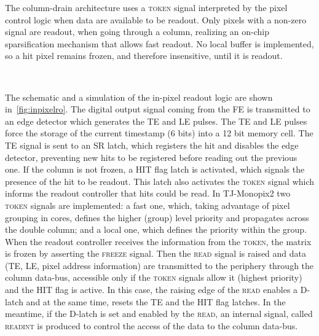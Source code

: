
The column-drain architecture uses a \textsc{token} signal interpreted by the pixel control logic when data are available to be readout. Only pixels with a non-zero signal are readout, when going through a column, realizing an on-chip sparsification mechanism that allows fast readout. No local buffer is implemented, so a hit pixel remains frozen, and therefore insensitive, until it is readout.

\begin{figure}[h!]
\centering
{}\\
\caption{}
\label{fig:inpixelro}
\end{figure}

\begin{comment}
\begin{figure}[h!]
\centering
\texttt{[image: inpixel\_ro]}
\caption{Schematic of TJ-Monopix2 in-pixel readout logic.}
\label{fig:inpixelro}
\end{figure}
\end{comment}



The schematic and a simulation of the in-pixel readout logic are shown in~\autoref{fig:inpixelro}.
The digital output signal coming from the FE is transmitted to an edge detector which generates the TE and LE pulses. The TE and LE pulses force the storage of the current timestamp (6 bits) into a 12 bit memory cell. The TE signal is sent to an SR latch, which registers the hit and disables the edge detector, preventing new hits to be registered before reading out the previous one. 
If the column is not frozen, a HIT flag latch is activated, which signals the presence of the hit to be readout. This latch also activates the \textsc{token} signal which informs the readout controller that hits could be read. In TJ-Monopix2 two \textsc{token} signals are implemented: a fast one, which, taking advantage of pixel grouping in  cores, defines the higher (group) level priority and propagates across the
double column; and a local one, which defines the priority within the group. When the readout controller receives the information from the \textsc{token}, the matrix is frozen by asserting the \textsc{freeze} signal. 
Then the \textsc{read} signal is raised and data (TE, LE, pixel address information) are transmitted to the periphery through the column data-bus, accessible only if the \textsc{token} signals allow it (highest priority) and the HIT flag is active. In this case, the raising edge of the \textsc{read} enables a D-latch and at the same time, resets the TE and the HIT flag latches. In the meantime, if the D-latch is set and enabled by the \textsc{read}, an internal signal, called \textsc{readint} is produced to control the access of the data to the column data-bus.\\

